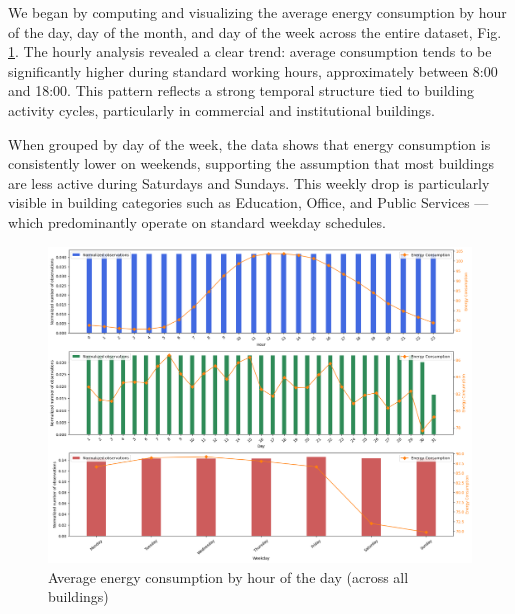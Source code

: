 We began by computing and visualizing the average energy consumption by hour of the day, day of the month, and day of the week across the entire dataset, Fig. \ref{fig:AvgConsumptionByHour}. The hourly analysis revealed a clear trend: average consumption tends to be significantly higher during standard working hours, approximately between 8:00 and 18:00. This pattern reflects a strong temporal structure tied to building activity cycles, particularly in commercial and institutional buildings.

When grouped by day of the week, the data shows that energy consumption is consistently lower on weekends, supporting the assumption that most buildings are less active during Saturdays and Sundays. This weekly drop is particularly visible in building categories such as Education, Office, and Public Services — which predominantly operate on standard weekday schedules.

\begin{figure}[!h] \centering \includegraphics[width=1\linewidth]{images/avg_consumption_by_hour.png} \caption{Average energy consumption by hour of the day (across all buildings)} \label{fig:AvgConsumptionByHour} \end{figure}

